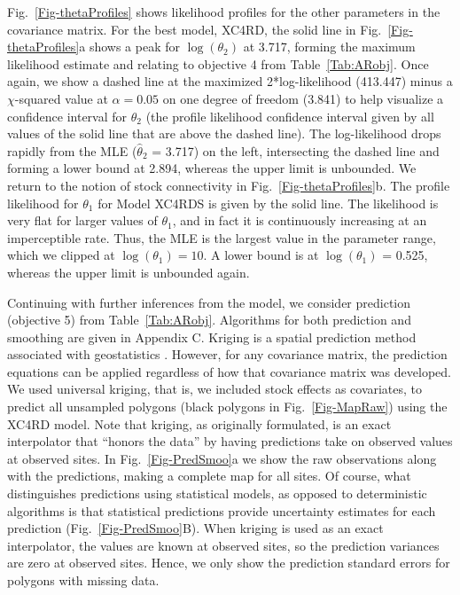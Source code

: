 \documentclass[11pt, titlepage]{article}\usepackage[]{graphicx}\usepackage[]{color}
\begin{document}
\begin{spacing}{1.9}
\begin{flushleft}
Fig.~\ref{Fig-thetaProfiles} shows likelihood profiles for the other parameters in the covariance matrix.  For the best model, XC4RD, the solid line in Fig.~\ref{Fig-thetaProfiles}a shows a peak for $\log(\theta_2)$ at 3.717, forming the maximum likelihood estimate and relating to objective 4 from Table~\ref{Tab:ARobj}. Once again, we show a dashed line at the maximized 2*log-likelihood (413.447) minus a $\chi$-squared value at $\alpha = 0.05$ on one degree of freedom (3.841) to help visualize a confidence interval for $\theta_2$ (the profile likelihood confidence interval given by all values of the solid line that are above the dashed line). The log-likelihood drops rapidly from the MLE ($\hat{\theta}_2$ = 3.717) on the left, intersecting the dashed line and forming a lower bound at 2.894, whereas the upper limit is unbounded. We return to the notion of stock connectivity in Fig.~\ref{Fig-thetaProfiles}b.  The profile likelihood for $\theta_1$ for Model XC4RDS is given by the solid line. The likelihood is very flat for larger values of $\theta_1$, and in fact it is continuously increasing at an imperceptible rate. Thus, the MLE is the largest value in the parameter range, which we clipped at $\log(\theta_1) = 10$. A lower bound is at $\log(\theta_1)$ = 0.525, whereas the upper limit is unbounded again.

Continuing with further inferences from the model, we consider prediction (objective 5) from Table~\ref{Tab:ARobj}. Algorithms for both prediction and smoothing are given in Appendix C.  Kriging is a spatial prediction method associated with geostatistics \citep{Cres:orig:1990}.  However, for any covariance matrix, the prediction equations can be applied regardless of how that covariance matrix was developed.  We used universal kriging, that is, we included stock effects as covariates, \citep[][pg. 151]{Huij:Math:univ:1971,Cres:stat:1993} to predict all unsampled polygons (black polygons in Fig.~\ref{Fig-MapRaw}) using the XC4RD model. Note that kriging, as originally formulated, is an exact interpolator \citep[pg. 129]{Cres:stat:1993} that ``honors the data'' \citep[p. 252]{Scha:Gotw:stat:2005} by having predictions take on observed values at observed sites.  In Fig.~\ref{Fig-PredSmoo}a we show the raw observations along with the predictions, making a complete map for all sites. Of course, what distinguishes predictions using statistical models, as opposed to deterministic algorithms \citep[e.g., inverse distance weighting,][]{Shep:two:1968} is that statistical predictions provide uncertainty estimates for each prediction (Fig.~\ref{Fig-PredSmoo}B).  When kriging is used as an exact interpolator, the values are known at observed sites, so the prediction variances are zero at observed sites.  Hence, we only show the prediction standard errors for polygons with missing data.  


\end{flushleft}
\end{spacing}
\end{document}
